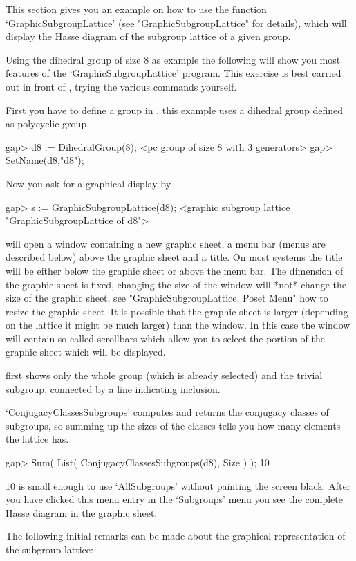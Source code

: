 This  section   gives  you an   example    on how  to    use the function
`GraphicSubgroupLattice' (see "GraphicSubgroupLattice" for  details), which 
will  display the Hasse diagram of the subgroup lattice of a given group.

Using the dihedral group of size $8$ as example the following will show you
most features of the `GraphicSubgroupLattice' program.  This exercise is
best carried out in front of {\XGAP}, trying the various commands yourself.

First  you   have to define a  group   in {\GAP},  this example  uses a
dihedral group defined as polycyclic group.

\begintt
gap> d8 := DihedralGroup(8);
<pc group of size 8 with 3 generators>
gap> SetName(d8,"d8");
\endtt

Now you ask for a graphical display by

\begintt
gap> s := GraphicSubgroupLattice(d8);
<graphic subgroup lattice "GraphicSubgroupLattice of d8">
\endtt

{\XGAP} will open a window containing a new graphic sheet, a menu bar
(menus are described below) above the graphic sheet and a title.  On most
systems the title will be either below the graphic sheet or above the menu
bar.  The dimension of the graphic sheet is fixed, changing the size of the
window will *not* change the size of the graphic sheet, see
"GraphicSubgroupLattice, Poset Menu" how to resize the graphic sheet.  It
is possible that the graphic sheet is larger (depending on the lattice it
might be much larger) than the window.  In this case the window will
contain so called scrollbars which allow you to select the portion of the
graphic sheet which will be displayed. 

{\XGAP} first shows only the whole group (which is already selected) and
the trivial subgroup, connected by a line indicating inclusion. 

`ConjugacyClassesSubgroups' computes and returns the conjugacy classes of
subgroups, so summing  up the sizes  of the classes   tells you how  many
elements the lattice has.

\begintt
    gap> Sum( List( ConjugacyClassesSubgroups(d8), Size ) );
    10 
\endtt

$10$ is small enough to use `AllSubgroups' without painting the screen
black.  After you have clicked this menu entry in the `Subgroups' menu you
see the complete Hasse diagram in the graphic sheet.

The   following initial  remarks  can    be  made  about  the   graphical
representation of the subgroup lattice:

